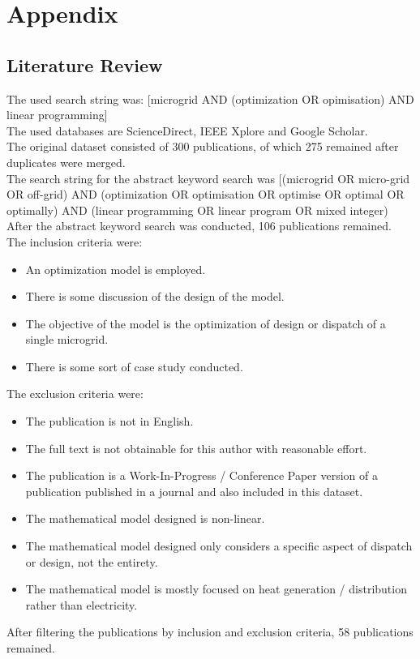 \documentclass[
	11pt,								%
	DIV10,								%
	a4paper,         					%
	oneside,							%
	headheight=20pt,					%
	footheight=20pt,					%
    parskip=full,						%
    listof=totoc,						%
	bibliography=totoc,					%
	index=totoc,						%
]{scrartcl}
\begin{document}
\newpage
{}	

\section{Appendix}
\subsection{Literature Review}
The used search string was:  [microgrid AND (optimization OR opimisation) AND linear programming]
\\
The used databases are ScienceDirect, IEEE Xplore and Google Scholar.
\\
The original dataset consisted of 300 publications, of which 275 remained after duplicates were merged.
\\
The search string for the abstract keyword search was [(microgrid OR micro-grid OR off-grid) AND (optimization OR optimisation OR optimise OR optimal OR optimally) AND (linear programming OR linear program OR mixed integer)
\\
After the abstract keyword search was conducted, 106 publications remained.
\\
The inclusion criteria were:
\begin{itemize}
	\item An optimization model is employed.
	\item There is some discussion of the design of the model.
	\item The objective of the model is the optimization of design or dispatch of a single microgrid.
	\item There is some sort of case study conducted.
\end{itemize}
The exclusion criteria were:
\begin{itemize}
	\item The publication is not in English.
	\item The full text is not obtainable for this author with reasonable effort.
	\item The publication is a Work-In-Progress / Conference Paper version of a publication published in a journal and also included in this dataset.
	\item The mathematical model designed is non-linear.
	\item The mathematical model designed only considers a specific aspect of dispatch or design, not the entirety.
	\item The mathematical model is mostly focused on heat generation / distribution rather than electricity.
\end{itemize}
After filtering the publications by inclusion and exclusion criteria, 58 publications remained.


\newpage								%
\renewcommand\refname{Literature}			%
\printbibliography
\end{document}
